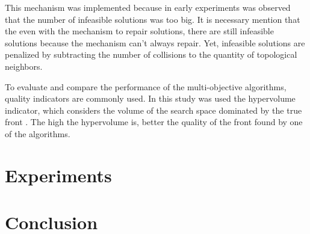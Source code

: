 This mechanism was implemented because in early experiments was observed that the number of infeasible solutions was too big. It is necessary mention that the even with the mechanism to repair solutions, there are still infeasible solutions because the mechanism can't always repair. Yet, infeasible solutions are penalized by subtracting the number of collisions to the quantity of topological neighbors.


To evaluate and compare the performance of the multi-objective algorithms, quality indicators are commonly used. In this study was used the hypervolume indicator, which considers the volume of the search space dominated by the true front \cite{zitzler2003performance}. The high the hypervolume is, better the quality of the front found by one of the algorithms.



\section{Experiments}

\section{Conclusion}